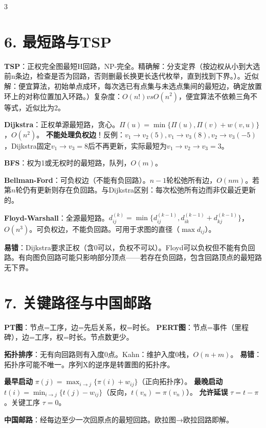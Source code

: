 \documentclass[10pt,a4paper,landscape]{ctexart}
\begin{document}
\begin{multicols}{3}
\section*{6. 最短路与TSP}

\textbf{TSP}：正权完全图最短H回路，NP-完全。精确解：分支定界（按边权从小到大选前n条边，检查是否为回路，否则删最长换更长迭代枚举，直到找到下界。）。近似解：便宜算法，初始单点成环，每次选已有点集与未选点集间的最短边，确定放置环上的对称位置加入环路。）复杂度：$O(n!) vs O(n^2)$，便宜算法不依赖三角不等式，近似比为2。

\textbf{Dijkstra}：正权单源最短路，贪心。$\Pi(u)=\min\{\Pi(u),\Pi(v)+w(v,u)\}$，$O(n^2)$。
\textbf{不能处理负权边}！反例：$v_1\to v_2(5),v_1\to v_3(8),v_2\to v_3(-5)$，Dijkstra固定$v_1\to v_3=8$后不再更新，实际最短为$v_1\to v_2\to v_3=3$。

\textbf{BFS}：权为1或无权时的最短路，队列，$O(m)$。

\textbf{Bellman-Ford}：可负权边（不能有负回路）。$n-1$轮松弛所有边，$O(nm)$。若第$n$轮仍有更新则存在负回路。与Dijkstra区别：每次松弛所有边而非仅最近更新的。

\textbf{Floyd-Warshall}：全源最短路。$d_{ij}^{(k)}=\min\{d_{ij}^{(k-1)},d_{ik}^{(k-1)}+d_{kj}^{(k-1)}\}$，$O(n^3)$。可负权边，不能负回路。可用于求图的直径（$\max d_{ij}$）。

\textbf{易错}：Dijkstra要求正权（含0可以，负权不可以）。Floyd可以负权但不能有负回路。有向图负回路可能只影响部分顶点——若存在负回路，包含回路顶点的最短路无下界。

\section*{7. 关键路径与中国邮路}

\textbf{PT图}：节点=工序，边=先后关系，权=时长。
\textbf{PERT图}：节点=事件（里程碑），边=工序，权=时长。节点数更少。

\textbf{拓扑排序}：无有向回路则有入度0点。Kahn：维护入度0栈，$O(n+m)$。
\textbf{易错}：拓扑序可能不唯一。序列X的逆序是转置图的拓扑序。

\textbf{最早启动} $\pi(j)=\max_{i\to j}\{\pi(i)+w_{ij}\}$（正向拓扑序）。
\textbf{最晚启动} $t(i)=\min_{i\to j}\{t(j)-w_{ij}\}$（反向，$t(v_n)=\pi(v_n)$）。
\textbf{允许延误} $\tau=t-\pi$。关键工序 $\tau=0$。

\textbf{中国邮路}：经每边至少一次回原点的最短回路。欧拉图→欧拉回路即解。


\end{multicols}
\end{document}
